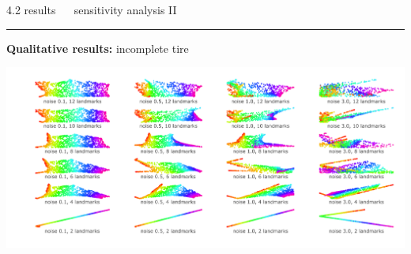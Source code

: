 \documentclass[11pt, compress, t, notes = noshow, xcolor = table, 
aspectratio = 1610]{beamer}
\begin{document}

\LARGE
\begin{frame}{\textcolor{gray!90}{4.2 results} ~~ sensitivity analysis II}
\normalsize
\vspace{-0.5cm}
\noindent \textcolor{gray!90}{\rule{\textwidth}{1pt}}
\smallskip

\textbf{Qualitative results:} incomplete tire

\vspace{0.3cm}

\includegraphics[trim = 40 20 0 0, clip, %
    width = \textwidth]{figures/sensitivity_noise_qual_incomplete_tire}

\end{frame}

\end{document}

